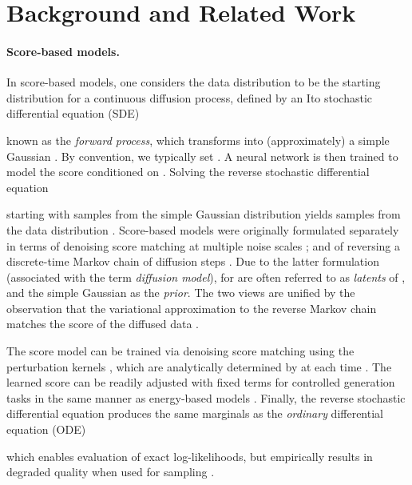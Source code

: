 \documentclass{article}
\begin{document}
\section{Background and Related Work} \label{sec:background}

\paragraph{\textbf{Score-based models.}} In score-based models, one considers the data distribution  to be the starting distribution for a continuous diffusion process, defined by an Ito stochastic differential equation (SDE)

known as the \emph{forward process}, which transforms  into (approximately) a simple Gaussian . By convention, we typically set . A neural network is then trained to model the score  conditioned on . Solving the reverse stochastic differential equation

starting with samples from the simple Gaussian distribution  yields samples from the data distribution  \cite{song2021score,anderson1982reverse}. Score-based models were originally  formulated separately in terms of denoising score matching at multiple noise scales \cite{song2019generative}; and of reversing a discrete-time Markov chain of diffusion steps \cite{ho2020denoising}. Due to the latter formulation (associated with the term \emph{diffusion model}),  for  are often referred to as \emph{latents} of , and the simple Gaussian  as the \emph{prior}. The two views are unified by the observation that the variational approximation to the reverse Markov chain matches the score of the diffused data \cite{song2021score}.

The score model  can be trained via denoising score matching \cite{song2019generative} using the perturbation kernels , which are analytically determined by  at each time . The learned score can be readily adjusted with fixed terms for controlled generation tasks in the same manner as energy-based models \cite{du2019implicit}. Finally, the reverse stochastic differential equation produces the same marginals  as the \emph{ordinary} differential equation (ODE)

which enables evaluation of exact log-likelihoods, but empirically results in degraded quality when used for sampling \cite{song2021score}.
\end{document}
